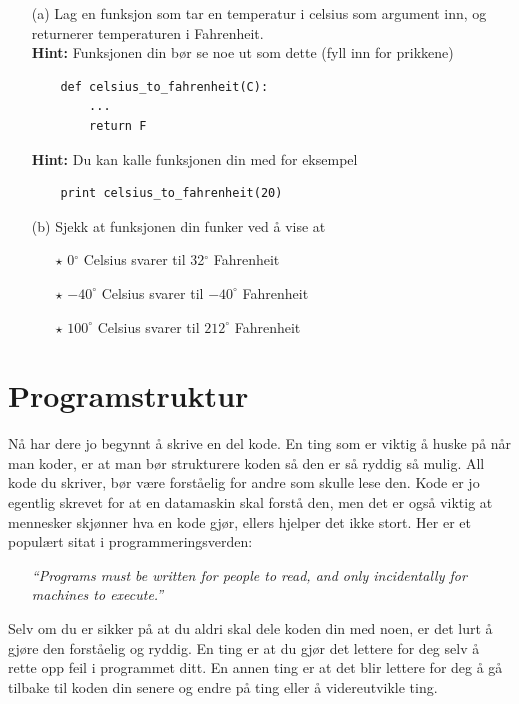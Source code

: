 \documentclass[a4paper, 11pt, notitlepage]{article}
\begin{document}
\begin{itemize}
	\item[(a)] Lag en funksjon som tar en temperatur i celsius som argument inn, og returnerer temperaturen i Fahrenheit. \\
	\textbf{Hint:} Funksjonen din bør se noe ut som dette (fyll inn for prikkene)
	\begin{lstlisting}
	def celsius_to_fahrenheit(C):
		...
		return F
	\end{lstlisting}
	\textbf{Hint:} Du kan kalle funksjonen din med for eksempel
	\begin{lstlisting}
	print celsius_to_fahrenheit(20)
	\end{lstlisting}
	\item[(b)] Sjekk at funksjonen din funker ved å vise at 
	\begin{itemize}
		\item[$\star$] 0$^\circ$ Celsius svarer til 32$^\circ$ Fahrenheit
		\item[$\star$] $-40^\circ$ Celsius svarer til $-40^\circ$ Fahrenheit
		\item[$\star$] $100^\circ$ Celsius svarer til $212^\circ$ Fahrenheit
	\end{itemize}
\end{itemize}


\clearpage

\section*{Programstruktur}

Nå har dere jo begynnt å skrive en del kode. En ting som er viktig å huske på når man koder, er at man bør strukturere koden så den er så ryddig så mulig. All kode du skriver, bør være forståelig for andre som skulle lese den. Kode er jo egentlig skrevet for at en datamaskin skal forstå den, men det er også viktig at mennesker skjønner hva en kode gjør, ellers hjelper det ikke stort. Her er et populært sitat i programmeringsverden:
\begin{itemize}
	\item[] \emph{``Programs must be written for people to read, and only incidentally for machines to execute.''}
\end{itemize}
Selv om du er sikker på at du aldri skal dele koden din med noen, er det lurt å gjøre den forståelig og ryddig. En ting er at du gjør det lettere for deg selv å rette opp feil i programmet ditt. En annen ting er at det blir lettere for deg å gå tilbake til koden din senere og endre på ting eller å videreutvikle ting. 
\end{document}
